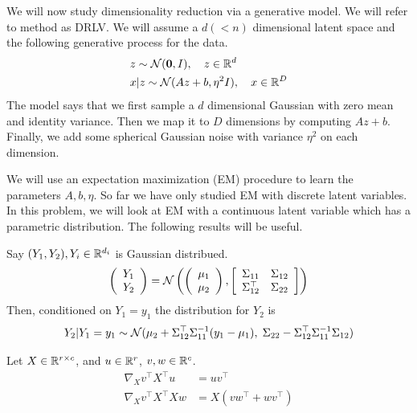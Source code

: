 We will now study dimensionality reduction via a generative model.
We will refer to method as DRLV.
We will assume a $d (<n)$ dimensional latent space and
the following generative process for the data.
\begin{align*}
& z \sim \mathcal{N}({\bf 0}, I),  \quad  z\in \mathbb{R}^d \\
& x|z \sim \mathcal{N}(Az + b, \eta^2 I),  \quad  x\in \mathbb{R}^D 
\end{align*}
The model says that we first sample a $d$ dimensional Gaussian with zero mean
and identity variance. Then we map it to $D$ dimensions by computing $Az+b$.
Finally, we add some spherical Gaussian noise with variance $\eta^2$ on each
dimension.

We will use an expectation maximization (EM)
procedure to learn the parameters $A, b, \eta$. So far we have only studied
 EM with discrete latent variables. In this problem, we will look at
EM with a continuous latent variable which has a parametric distribution.
The following results will be useful.\\

\begin{fact}
Say $(Y_1, Y_2), Y_i \in \mathbb{R}^{d_i}$ is Gaussian distribued.
\[
\left(\begin{array}{c}Y_1 \\ Y_2\end{array}\right) =
\mathcal{N} \left( \left(\begin{array}{c} \mu_1 \\ \mu_2 \end{array} \right), 
\left[ \begin{array}{cc} \Sigma_{11} & \Sigma_{12} \\ \Sigma_{12}^\top &
  \Sigma_{22} \end{array} \right] 
  \right)
\]
Then, conditioned on $Y_1 = y_1$ the distribution for $Y_2$ is
\[
Y_2 | Y_1 = y_1 \sim \mathcal{N}(\mu_2+ \Sigma_{12}^\top \Sigma_{11}^{-1} (y_1 - \mu_1), \;
  \Sigma_{22} - \Sigma_{12}^\top \Sigma_{11}^{-1}\Sigma_{12} )
\]
\end{fact}

\begin{fact}
Let $X\in \mathbb{R}^{r\times c}$, and $u\in \mathbb{R}^r$, $v,w \in \mathbb{R}^c$.
\begin{align*}
\nabla_X v^\top X^\top u &= uv^\top \\
\nabla_X v^\top X^\top X w &= X(vw^\top + wv^\top)
\end{align*}
\end{fact}
\vspace{0.1in}

